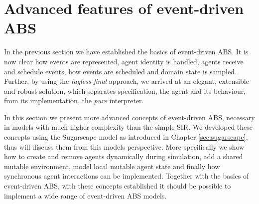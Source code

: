 \section{Advanced features of event-driven ABS}
\label{sec:advanced_eventdriven_ABS}

In the previous section we have established the basics of event-driven ABS. It is now clear how events are represented, agent identity is handled, agents receive and schedule events, how events are scheduled and domain state is sampled. Further, by using the \textit{tagless final} approach, we arrived at an elegant, extensible and robust solution, which separates specification, the agent and its behaviour, from its implementation, the \textit{pure} interpreter. 

In this section we present more advanced concepts of event-driven ABS, necessary in models with much higher complexity than the simple SIR. We developed these concepts using the Sugarscape model as introduced in Chapter \ref{sec:sugarscape}, thus will discuss them from this models perspective. More specifically we show how to create and remove agents dynamically during simulation, add a shared mutable environment, model local mutable agent state and finally how synchronous agent interactions can be implemented. Together with the basics of event-driven ABS, with these concepts established it should be possible to implement a wide range of event-driven ABS models.










